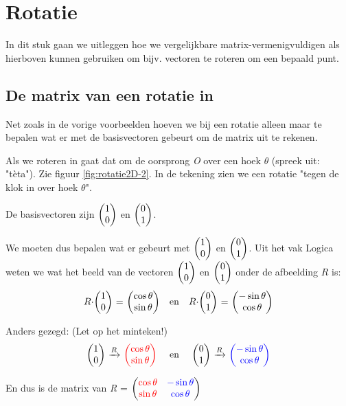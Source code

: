\section{Rotatie}		
In dit stuk gaan we uitleggen hoe we vergelijkbare matrix-vermenigvuldigen als hierboven kunnen gebruiken om bijv. vectoren te roteren om een bepaald punt.

\label{rotatie}
\subsection{De matrix van een rotatie in \RT}
Net zoals in de vorige voorbeelden hoeven we bij een rotatie alleen maar te bepalen wat er met de basisvectoren gebeurt om de matrix uit te rekenen. 


Als we roteren in \RT gaat dat om de oorsprong \textit{O} over een hoek $\theta$ (spreek uit: "tèta"). Zie figuur  \ref{fig:rotatie2D-2}. In de tekening zien we een rotatie "tegen de klok in over hoek $\theta$". 

De basisvectoren zijn $\vectwee{1}{0} $ en $\vectwee{0}{1} $. 

We moeten dus bepalen wat er gebeurt met $\vectwee{1}{0} $ en $\vectwee{0}{1} $. Uit het vak Logica weten we wat het beeld van de vectoren $\vectwee{1}{0} $ en $\vectwee{0}{1} $ onder de afbeelding $R$ is: 
\[
    R\cdot \vectwee{1}{0} \ =\ \vectwee{\cos \theta}{\sin \theta} \ \ \text{ en } \ \ R \cdot \vectwee{0}{1} \ =\ \vectwee{-\sin \theta}{\cos \theta}
\]

Anders gezegd: (Let op het minteken!)
\[
    \vectwee{1}{0} \ \xrightarrow{R} \ \vectwee[red]{\cos \theta}{\sin \theta} \quad \text{ en } \quad 
    \vectwee{0}{1} \ \xrightarrow{R} \ \vectwee[blue]{-\sin \theta}{\cos \theta} 
\]

En dus is de matrix van \textit{R} =  
$  \begin{pmatrix}  {\color{red}\cos \theta} & {\color{blue}-\sin \theta}  \\  {\color{red}\sin \theta} & {\color{blue}\cos \theta} \end{pmatrix} $

